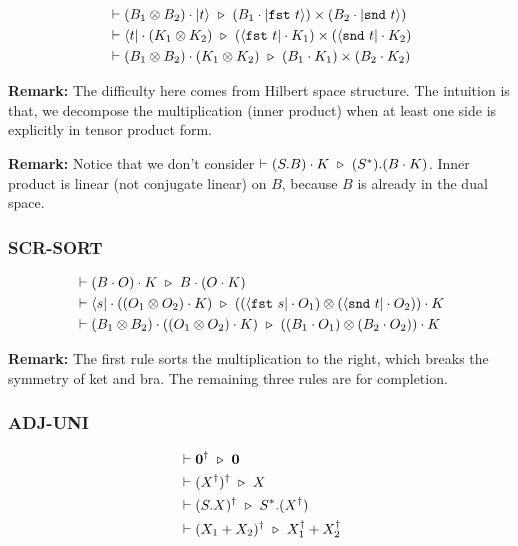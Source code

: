 \begin{align*}
  & \vdash (B_1 \otimes B_2) \cdot |t\rangle \ \triangleright\  (B_1 \cdot |\texttt{fst}\ t\rangle) \times (B_2 \cdot |\texttt{snd}\ t\rangle) \\
  & \vdash \langle t| \cdot (K_1 \otimes K_2) \ \triangleright\  (\langle \texttt{fst}\ t| \cdot K_1) \times (\langle \texttt{snd}\ t| \cdot K_2) \\
  & \vdash (B_1 \otimes B_2) \cdot (K_1 \otimes K_2) \ \triangleright\  (B_1 \cdot K_1) \times (B_2 \cdot K_2)
\end{align*}

\textbf{Remark: } The difficulty here comes from Hilbert space structure. The intuition is that, we decompose the multiplication (inner product) when at least one side is explicitly in tensor product form.

\textbf{Remark:} Notice that we don't consider $\vdash (S.B) \cdot K \ \triangleright\  (S^*).(B \cdot K)$. Inner product is linear (not conjugate linear) on $B$, because $B$ is already in the dual space.

\subsubsection*{\textsf{SCR-SORT}}
\begin{align*}
  & \vdash (B \cdot O) \cdot K \ \triangleright\  B \cdot (O \cdot K) \\
  & \vdash \langle s| \cdot ((O_1 \otimes O_2) \cdot K) \ \triangleright\  ((\langle \texttt{fst}\ s| \cdot O_1) \otimes (\langle \texttt{snd}\ t| \cdot O_2)) \cdot K \\
  & \vdash (B_1 \otimes B_2) \cdot ((O_1 \otimes O_2) \cdot K) \ \triangleright\  ((B_1 \cdot O_1) \otimes (B_2 \cdot O_2)) \cdot K \\
\end{align*}


\textbf{Remark: } The first rule sorts the multiplication to the right, which breaks the symmetry of ket and bra. The remaining three rules are for completion.

\subsubsection*{\textsf{ADJ-UNI}}
\begin{align*}
  & \vdash \textbf{0}^\dagger \ \triangleright\  \textbf{0} \\
  & \vdash (X^\dagger)^\dagger \ \triangleright\  X \\
  & \vdash (S.X)^\dagger \ \triangleright\  S^*.(X^\dagger) \\
  & \vdash (X_1 + X_2)^\dagger \ \triangleright\  X_1^\dagger + X_2^\dagger\\
\end{align*}

